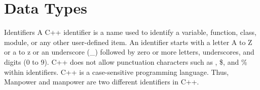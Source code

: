 \documentclass[../lecture2-variables.tex]{subfiles}
\begin{document}
\section{Data Types}


\begin{frame}[fragile]{Identifiers}
    A C++ identifier is a name used to identify a variable, function, class,
    module, or any other user-defined item. \newline \newline
    An identifier starts with a letter A to Z or a to z or an underscore (\_)
    followed by zero or more letters, underscores, and digits (0 to 9). \newline \newline
    C++ does not allow punctuation characters such as \@, \$, and \% within
    identifiers. C++ is a case-sensitive programming language. Thus, Manpower
    and manpower are two different identifiers in C++.
\end{frame}

\end{document}
